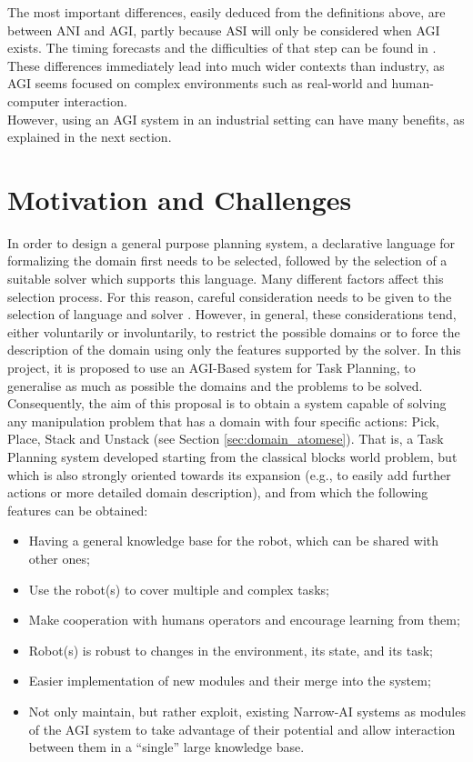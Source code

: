 The most important differences, easily deduced from the definitions above, are between ANI and AGI, partly because ASI will only be considered when AGI exists. 
The timing forecasts and the difficulties of that step can be found in \cite{995_experts_opinions}. \\
These differences immediately lead into much wider contexts than industry, as AGI seems focused on complex environments such as real-world and human-computer interaction. \\
However, using an AGI system in an industrial setting can have many benefits, as explained in the next section.


\section{Motivation and Challenges}\label{sec:motivation} %

In order to design a general purpose planning system, a declarative language for formalizing the domain first needs to be selected, followed by the selection of a suitable solver which supports this language. Many different factors affect this selection process.
For this reason, careful consideration needs to be given to the selection of language and solver \cite{DBLP:journals/corr/abs-1804-08229}.
However, in general, these considerations tend, either voluntarily or involuntarily, to restrict the possible domains or to force the description of the domain using only the features supported by the solver.
In this project, it is proposed to use an AGI-Based system for Task Planning, to generalise as much as possible the domains and the problems to be solved.
Consequently, the aim of this proposal is to obtain a system capable of solving any manipulation problem that has a domain with four specific actions: Pick, Place, Stack and Unstack (see Section \ref{sec:domain_atomese}).  
That is, a Task Planning system developed starting from the classical blocks world problem, but which is also strongly oriented towards its expansion (e.g., to easily add further actions or more detailed domain description), and from which the following features can be obtained:

\begin{itemize}
	\item Having a general knowledge base for the robot, which can be shared with other ones;
	\item Use the robot(s) to cover multiple and complex tasks;
	\item Make cooperation with humans operators and encourage learning from them;
	\item Robot(s) is robust to changes in the environment, its state, and its task;
	\item Easier implementation of new modules and their merge into the system;
	\item Not only maintain, but rather exploit, existing Narrow-AI systems as modules of the AGI system to take advantage of their potential and allow interaction between them in a \enquote{single} large knowledge base.
\end{itemize}

